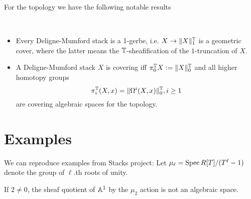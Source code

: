 \documentclass{article}
\begin{document}
	For the \etale topology we have the following notable results 
	\begin{theorem}
		\
		\begin{itemize}
			\item Every Deligne-Mumford stack is a 1-gerbe, i.e. $X \to \|X\|_1^{\mathbb{T}}$ is a geometric cover, where the latter means the $\mathbb{T}$-sheafification of the $1$-truncation of $X$.
			\item 
			A Deligne-Mumford stack $X$ is covering iff $\pi_0^{\mathbb{T}} X := \|X\|_0^{\mathbb{T}}$ and all higher homotopy groups 
			\[
			\pi_i^{\mathbb{T}}(X,x) = \|\Omega^i (X , x)\|_0^{\mathbb{T}} , i \ge 1
			\]
			are covering algebraic spaces for the \etale topology.  
		\end{itemize}
	\end{theorem}
	\section{Examples}
	We can reproduce examples from Stacks project:
	Let $\mu_\ell = \operatorname{Spec} R[T] / (T^\ell - 1)$ denote the group of $\ell$.th roots of unity.
	\begin{example}
		If $2 \neq 0$, the sheaf quotient of $\mathbb{A}^1$ by the $\mu_2$ action is not an algebraic space.    
	\end{example}
	
\end{document}

